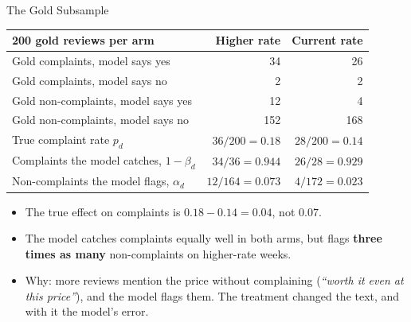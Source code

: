 \documentclass[aspectratio=169, 11pt, handout]{beamer}
\begin{document}
\begin{frame}{The Gold Subsample}

\begin{center}
\small
\begin{tabular}{lrr}
\toprule
\textbf{200 gold reviews per arm} & \textbf{Higher rate} & \textbf{Current rate} \\
\midrule
Gold complaints, model says yes & 34 & 26 \\
Gold complaints, model says no & 2 & 2 \\
Gold non-complaints, model says yes & 12 & 4 \\
Gold non-complaints, model says no & 152 & 168 \\
\midrule
True complaint rate $p_d$ & $36/200 = 0.18$ & $28/200 = 0.14$ \\
Complaints the model catches, $1 - \beta_d$ & $34/36 = 0.944$ & $26/28 = 0.929$ \\
Non-complaints the model flags, $\alpha_d$ & $12/164 = 0.073$ & $4/172 = 0.023$ \\
\bottomrule
\end{tabular}
\end{center}

\medskip

\begin{itemize}
  \item The true effect on complaints is $0.18 - 0.14 = 0.04$, not $0.07$.
  \item The model catches complaints equally well in both arms, but flags \textbf{three times as many} non-complaints on higher-rate weeks.
  \item Why: more reviews mention the price without complaining (\emph{``worth it even at this price''}), and the model flags them. The treatment changed the text, and with it the model's error.
\end{itemize}
\end{frame}
\end{document}
